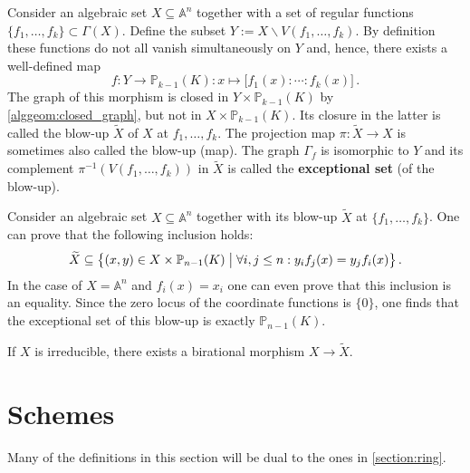     \begin{construct}[Blow-up]
        Consider an algebraic set $X\subseteq\mathbb{A}^n$ together with a set of regular functions $\{f_1,\ldots,f_k\}\subset\Gamma(X)$. Define the subset $Y:=X\backslash V(f_1,\ldots,f_k)$. By definition these functions do not all vanish simultaneously on $Y$ and, hence, there exists a well-defined map \[f:Y\rightarrow \mathbb{P}_{k-1}(K):x\mapsto\bigl[f_1(x):\cdots:f_k(x)\bigr]\,.\] The graph of this morphism is closed in $Y\times\mathbb{P}_{k-1}(K)$ by \cref{alggeom:closed_graph}, but not in $X\times\mathbb{P}_{k-1}(K)$. Its closure in the latter is called the blow-up $\widetilde{X}$ of $X$ at $f_1,\ldots,f_k$. The projection map $\pi:\widetilde{X}\rightarrow X$ is sometimes also called the blow-up (map). The graph $\Gamma_f$ is isomorphic to $Y$ and its complement $\pi^{-1}(V(f_1,\ldots,f_k))$ in $\widetilde{X}$ is called the \textbf{exceptional set} (of the blow-up).
    \end{construct}

    \begin{construct}
        Consider an algebraic set $X\subseteq\mathbb{A}^n$ together with its blow-up $\widetilde{X}$ at $\{f_1,\ldots,f_k\}$. One can prove that the following inclusion holds:
        \begin{gather}
            \widetilde{X}\subseteq\bigl\{(x,y)\in X\times\mathbb{P}_{n-1}(K)\bigm\vert\forall i,j\leq n:y_if_j(x)=y_jf_i(x)\bigr\}\,.
        \end{gather}
        In the case of $X=\mathbb{A}^n$ and $f_i(x)=x_i$ one can even prove that this inclusion is an equality. Since the zero locus of the coordinate functions is $\{0\}$, one finds that the exceptional set of this blow-up is exactly $\mathbb{P}_{n-1}(K)$.
    \end{construct}

    \begin{property}
        If $X$ is irreducible, there exists a birational morphism $X\rightarrow\widetilde{X}$.
    \end{property}

\section{Schemes}\label{section:schemes}

    Many of the definitions in this section will be dual to the ones in \cref{section:ring}.


